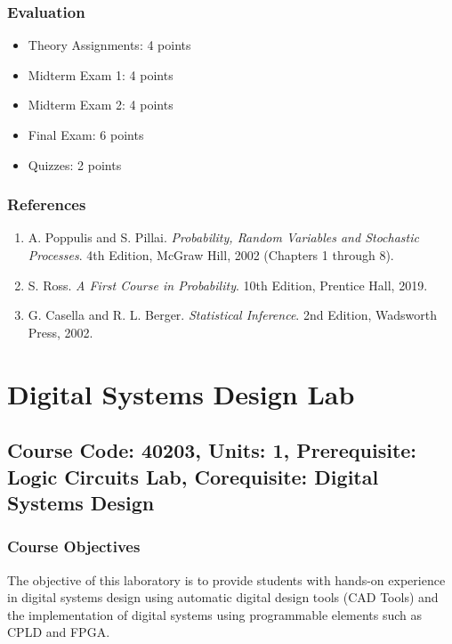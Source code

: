 \documentclass[12pt]{article}
\begin{document}
\subsubsection*{Evaluation}
\begin{itemize}
    \item Theory Assignments: 4 points
    \item Midterm Exam 1: 4 points
    \item Midterm Exam 2: 4 points
    \item Final Exam: 6 points
    \item Quizzes: 2 points
\end{itemize}

\subsubsection*{References}
\begin{enumerate}
    \item A. Poppulis and S. Pillai. \textit{Probability, Random Variables and Stochastic Processes}. 4th Edition, McGraw Hill, 2002 (Chapters 1 through 8).
    \item S. Ross. \textit{A First Course in Probability}. 10th Edition, Prentice Hall, 2019.
    \item G. Casella and R. L. Berger. \textit{Statistical Inference}. 2nd Edition, Wadsworth Press, 2002.
\end{enumerate}

\newpage

\section{Digital Systems Design Lab}
\subsection*{Course Code: 40203, Units: 1, Prerequisite: Logic Circuits Lab, Corequisite: Digital Systems Design}

\subsubsection*{Course Objectives}
The objective of this laboratory is to provide students with hands-on experience in digital systems design using automatic digital design tools (CAD Tools) and the implementation of digital systems using programmable elements such as CPLD and FPGA.
\end{document}
